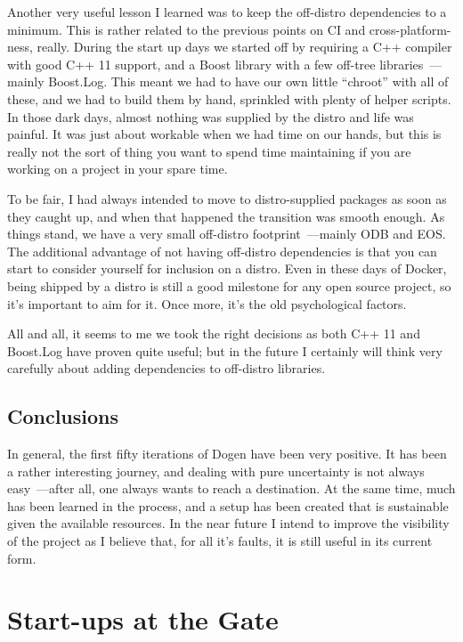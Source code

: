 \documentclass{book}
\begin{document}
Another very useful lesson I learned was to keep the off-distro
dependencies to a minimum. This is rather related to the previous
points on CI and cross-platform-ness, really. During the start up days
we started off by requiring a C++ compiler with good C++ 11 support,
and a Boost library with a few off-tree libraries~---mainly
Boost.Log. This meant we had to have our own little ``chroot'' with
all of these, and we had to build them by hand, sprinkled with plenty
of helper scripts. In those dark days, almost nothing was supplied by
the distro and life was painful. It was just about workable when we
had time on our hands, but this is really not the sort of thing you
want to spend time maintaining if you are working on a project in your
spare time.

To be fair, I had always intended to move to distro-supplied packages
as soon as they caught up, and when that happened the transition was
smooth enough. As things stand, we have a very small off-distro
footprint~---mainly ODB and EOS. The additional advantage of not having
off-distro dependencies is that you can start to consider yourself for
inclusion on a distro. Even in these days of Docker, being shipped by
a distro is still a good milestone for any open source project, so
it's important to aim for it. Once more, it's the old psychological
factors.

All and all, it seems to me we took the right decisions as both C++ 11
and Boost.Log have proven quite useful; but in the future I certainly
will think very carefully about adding dependencies to off-distro
libraries.

\section{Conclusions}

In general, the first fifty iterations of Dogen have been very
positive. It has been a rather interesting journey, and dealing with
pure uncertainty is not always easy~---after all, one always wants to
reach a destination. At the same time, much has been learned in the
process, and a setup has been created that is sustainable given the
available resources. In the near future I intend to improve the
visibility of the project as I believe that, for all it's faults, it
is still useful in its current form.

\chapter{Start-ups at the Gate}
\end{document}
